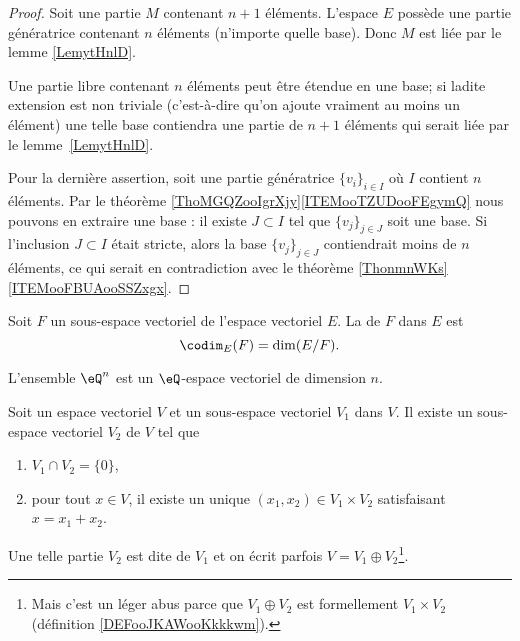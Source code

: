 \begin{proof}
	Soit une partie \( M\) contenant \( n+1\) éléments. L'espace \( E\) possède une partie génératrice contenant \( n\) éléments (n'importe quelle base). Donc \( M\) est liée par le lemme \ref{LemytHnlD}.

	Une partie libre contenant \( n\) éléments peut être étendue en une base; si ladite extension est non triviale (c'est-à-dire qu'on ajoute vraiment au moins un élément) une telle base contiendra une partie de \( n+1\) éléments qui serait liée par le lemme~\ref{LemytHnlD}.

	Pour la dernière assertion, soit une partie génératrice \( \{ v_i \}_{i\in I}\) où \( I\) contient \( n\) éléments. Par le théorème \ref{ThoMGQZooIgrXjy}\ref{ITEMooTZUDooFEgymQ} nous pouvons en extraire une base : il existe \( J\subset I\) tel que \( \{ v_j \}_{j\in J}\) soit une base. Si l'inclusion \( J\subset I\) était stricte, alors la base \( \{ v_j \}_{j\in J}\) contiendrait moins de \( n\) éléments, ce qui serait en contradiction avec le théorème \ref{ThonmnWKs}\ref{ITEMooFBUAooSSZxgx}.
\end{proof}

\begin{definition}\label{DefCodimension}
	Soit \( F\) un sous-espace vectoriel de l'espace vectoriel \( E\). La  de \( F\) dans \( E\) est
	\begin{equation}
		\codim_E(F)=\dim(E/F).
	\end{equation}
\end{definition}

\begin{lemma}		\label{LEMooGNDPooAhvIek}
	L'ensemble \( \eQ^n\) est un \( \eQ\)-espace vectoriel de dimension \( n\).
\end{lemma}

\begin{propositionDef}	\label{PROPooRKOVooBFRCKq}
	Soit un espace vectoriel \( V\) et un sous-espace vectoriel \( V_1\) dans \( V\). Il existe un sous-espace vectoriel \( V_2\) de \( V\) tel que
	\begin{enumerate}
		\item
		      \( V_1\cap V_2=\{ 0 \}\),
		\item
		      pour tout \( x\in V\), il existe un unique \( (x_1,x_2)\in V_1\times V_2\) satisfaisant \( x=x_1+x_2\).
	\end{enumerate}

	Une telle partie \( V_2\) est dite  de \( V_1\) et on écrit parfois \( V=V_1\oplus V_2\)\footnote{Mais c'est un léger abus parce que \( V_1\oplus V_2\) est formellement \( V_1\times V_2\) (définition \ref{DEFooJKAWooKkkkwm}).}.
\end{propositionDef}

